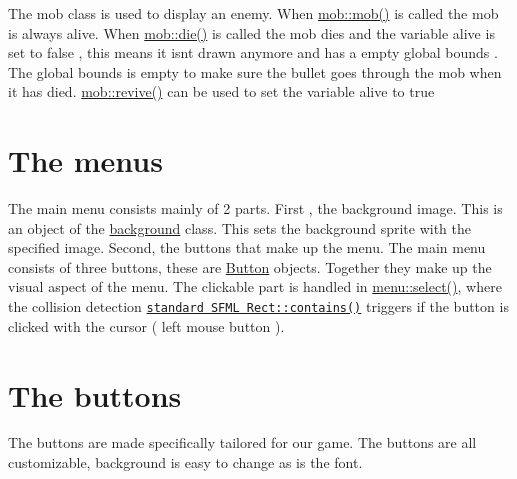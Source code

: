 The mob class is used to display an enemy. When \hyperlink{classmob_ac524dd40986df00721239b66c552437e}{mob\+::mob()} is called the mob is always alive. When \hyperlink{classmob_ae892b3ce84f4aa16411b385abb5410c8}{mob\+::die()} is called the mob dies and the variable alive is set to false , this means it isn\textquotesingle{}t drawn anymore and has a empty global bounds . The global bounds is empty to make sure the bullet goes through the mob when it has died. \hyperlink{classmob_a3bce6c06653881f8be86fbc60a2b67cb}{mob\+::revive()} can be used to set the variable alive to true\hypertarget{index_menu}{}\section{The menu\textquotesingle{}s}\label{index_menu}
The main menu consists mainly of 2 parts. First , the background image. This is an object of the \hyperlink{classbackground}{background} class. This sets the background sprite with the specified image. Second, the buttons that make up the menu. The main menu consists of three buttons, these are \hyperlink{class_button}{Button} objects. Together they make up the visual aspect of the menu. The clickable part is handled in \hyperlink{classmenu_a06744d58a2aad693d3637d0485aa7984}{menu\+::select()}, where the collision detection \href{https://www.sfml-dev.org/documentation/2.0/classsf_1_1Rect.php#aa8a5364c84de6dd5299f833b54e31ef1 }{\tt standard S\+F\+ML Rect\+::contains()} triggers if the button is clicked with the cursor ( left mouse button ).\hypertarget{index_Button}{}\section{The buttons}\label{index_Button}
The buttons are made specifically tailored for our game. The buttons are all customizable, background is easy to change as is the font.


